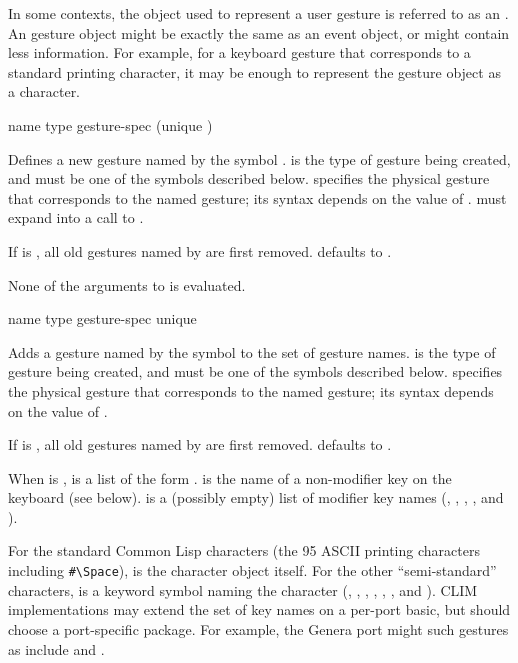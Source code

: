 In some contexts, the object used to represent a user gesture is referred to as
an .  An gesture object might be exactly the same as an
event object, or might contain less information.  For example, for a keyboard
gesture that corresponds to a standard printing character, it may be enough to
represent the gesture object as a character.


 {name type gesture-spec \key (unique )} 

Defines a new gesture named by the symbol .   is the type of
gesture being created, and must be one of the symbols described below.
 specifies the physical gesture that corresponds to the named
gesture; its syntax depends on the value of .
 must expand into a call to .

If  is , all old gestures named by  are first
removed.   defaults to .

None of the arguments to  is evaluated.

 {name type gesture-spec \key unique}

Adds a gesture named by the symbol  to the set of gesture names.
 is the type of gesture being created, and must be one of the symbols
described below.   specifies the physical gesture that
corresponds to the named gesture; its syntax depends on the value of .

If  is , all old gestures named by  are first
removed.   defaults to .

When  is ,  is a list of the form
.   is the name of a
non-modifier key on the keyboard (see below).   is a
(possibly empty) list of modifier key names (, ,
, , and ).

For the standard Common Lisp characters (the 95 ASCII printing characters
including \verb+#\Space+),  is the character object itself.  For
the other ``semi-standard'' characters,  is a keyword symbol
naming the character (, , , ,
, , and ).  CLIM implementations may extend
the set of key names on a per-port basic, but should choose a port-specific
package.  For example, the Genera port might such gestures as include
 and .

